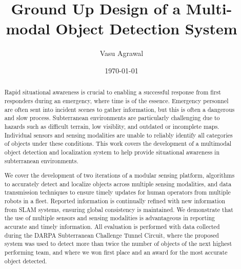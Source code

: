 \documentclass[12pt]{cmuthesis}
\begin{document}
 
\frontmatter

\pagestyle{empty}

\title{ %
{\bf Ground Up Design of a Multi-modal Object Detection System}}
\author{Vasu Agrawal}
\date{\today}


\support{}
\disclaimer{}



\maketitle

\pagestyle{plain} %


\begin{abstract}
Rapid situational awareness is crucial to enabling a successful response from first responders during an emergency, where time is of the essence. Emergency personnel are often sent into incident scenes to gather information, but this is often a dangerous and slow process. Subterranean environments are particularly challenging due to hazards such as difficult terrain, low visiblity, and outdated or incomplete maps. Individual sensors and sensing modalities are unable to reliably identify all categories of objects under these conditions. This work covers the development of a multimodal object detection and localization system to help provide situational awareness in subterranean environments.

We cover the development of two iterations of a modular sensing platform, algorithms to accurately detect and localize objects across multiple sensing modalities, and data transmission techniques to ensure timely updates for human operators from multiple robots in a fleet. Reported information is continually refined with new information from SLAM systems, ensuring global consistency is maintained. We demonstrate that the use of multiple sensors and sensing modalities is advantageous in reporting accurate and timely information. All evaluation is performed with data collected during the DARPA Subterranean Challenge Tunnel Circuit, where the proposed system was used to detect more than twice the number of objects of the next highest performing team, and where we won first place and an award for the most accurate object detected.
\end{abstract}
\end{document}
